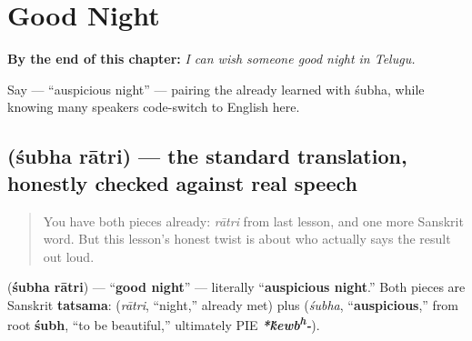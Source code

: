 
\chapter{Good Night}
\label{ch:te-good-night}

\begin{chapteropening}
\textbf{By the end of this chapter:} \emph{I can wish someone good night in Telugu.}

Say   — \textquotedblleft{}auspicious night\textquotedblright{} — pairing the  already learned with śubha, while knowing many speakers code-switch to English here.
\end{chapteropening}

\section[\texorpdfstring{\te{శుభ} \te{రాత్రి} (śubha rātri)}{శుభ రాత్రి (śubha rātri)}]{  (śubha rātri) — the standard translation, honestly checked against real speech}

\label{lesson:TE-C25-shubha-ratri}



\begin{quote}
You have both pieces already: \emph{rātri} from last lesson, and one more Sanskrit word. But this lesson's honest twist is about who actually says the result out loud.
\end{quote}

\begin{cousinweb}
\textbf{ } (\textbf{śubha rātri}) — \textquotedblleft{}\textbf{good night}\textquotedblright{} — literally \textquotedblleft{}\textbf{auspicious night}.\textquotedblright{} Both pieces are Sanskrit \textbf{tatsama}: \textbf{} (\emph{rātri}, \textquotedblleft{}night,\textquotedblright{} already met) plus \textbf{} (\emph{śubha}, \textquotedblleft{}\textbf{auspicious},\textquotedblright{} from root \textbf{śubh}, \textquotedblleft{}to be beautiful,\textquotedblright{} ultimately PIE \emph{\textbf{*\'{k}ewb\textsuperscript{h}-}}).
\end{cousinweb}

